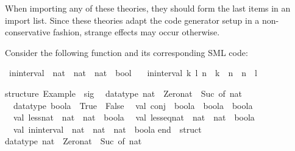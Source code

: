 \begin{isabellebody}
\begin{isamarkuptext}
  \begin{warn}
    When importing any of these theories, they should form the last
    items in an import list.  Since these theories adapt the code
    generator setup in a non-conservative fashion, strange effects may
    occur otherwise.
  \end{warn}%
\end{isamarkuptext}%
\isamarkuptrue%
%
\isamarkuptrue%
%
\begin{isamarkuptext}%
Consider the following function and its corresponding SML code:%
\end{isamarkuptext}%
\isamarkuptrue%
%
\isadelimquote
%
\endisadelimquote
%
\isatagquote
{}\isamarkupfalse%
\ in{\isacharunderscore}interval\ {\isacharcolon}{\isacharcolon}\ {\isachardoublequoteopen}nat\ {\isasymtimes}\ nat\ {\isasymRightarrow}\ nat\ {\isasymRightarrow}\ bool{\isachardoublequoteclose}\ \isanewline
\ \ {\isachardoublequoteopen}in{\isacharunderscore}interval\ {\isacharparenleft}k{\isacharcomma}\ l{\isacharparenright}\ n\ {\isasymlongleftrightarrow}\ k\ {\isasymle}\ n\ {\isasymand}\ n\ {\isasymle}\ l{\isachardoublequoteclose}%
\endisatagquote
{\isafoldquote}%
%
\isadelimquote
%
\endisadelimquote
%
\isadeliminvisible
%
\endisadeliminvisible
%
\isataginvisible
%
\endisataginvisible
{\isafoldinvisible}%
%
\isadeliminvisible
%
\endisadeliminvisible
%
\isadelimquotetypewriter
%
\endisadelimquotetypewriter
%
\isatagquotetypewriter
%
\begin{isamarkuptext}%
structure\ Example\ {\isacharcolon}\ sig\isanewline
\ \ datatype\ nat\ {\isacharequal}\ Zero{\isacharunderscore}nat\ {\isacharbar}\ Suc\ of\ nat\isanewline
\ \ datatype\ boola\ {\isacharequal}\ True\ {\isacharbar}\ False\isanewline
\ \ val\ conj\ {\isacharcolon}\ boola\ {\isacharminus}{\isachargreater}\ boola\ {\isacharminus}{\isachargreater}\ boola\isanewline
\ \ val\ less{\isacharunderscore}nat\ {\isacharcolon}\ nat\ {\isacharminus}{\isachargreater}\ nat\ {\isacharminus}{\isachargreater}\ boola\isanewline
\ \ val\ less{\isacharunderscore}eq{\isacharunderscore}nat\ {\isacharcolon}\ nat\ {\isacharminus}{\isachargreater}\ nat\ {\isacharminus}{\isachargreater}\ boola\isanewline
\ \ val\ in{\isacharunderscore}interval\ {\isacharcolon}\ nat\ {\isacharasterisk}\ nat\ {\isacharminus}{\isachargreater}\ nat\ {\isacharminus}{\isachargreater}\ boola\isanewline
end\ {\isacharequal}\ struct\isanewline
\isanewline
datatype\ nat\ {\isacharequal}\ Zero{\isacharunderscore}nat\ {\isacharbar}\ Suc\ of\ nat{\isacharsemicolon}\isanewline

\end{isamarkuptext}
\end{isabellebody}
